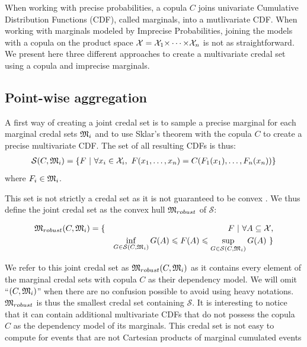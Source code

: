 When working with precise probabilities, a copula $C$ joins univariate Cumulative Distribution Functions (CDF), called marginals, into a mutlivariate CDF. When working with marginals modeled by Imprecise Probabilities, joining the models with a copula on the product space ${\mathcal{X}}={\mathcal{X}}_1{\times\dots\times}{\mathcal{X}}_n$ is not as straightforward. We present here three different approaches to create a multivariate credal set using a copula and imprecise marginals. 

\subsection{Point-wise aggregation}
A first way of creating a joint credal set is to sample a precise marginal for each marginal credal sets ${\mathfrak{M}}_i$ and to use Sklar's theorem with the copula $C$ to create a precise multivariate CDF. The set of all resulting CDFs is thus:
\begin{eqnarray}\label{eq:robust_ancestor}
    \mathcal{S}(C,{\mathfrak{M}}_i) = \{F~|~\forall x_i \in {\mathcal{X}}_i,~ F(x_1,\dots,x_n) = C(F_1(x_1), \dots, F_n(x_n))\}
\end{eqnarray} where $F_i\in{\mathfrak{M}}_i$.

This set is not strictly a credal set as it is not guaranteed to be convex \cite{schmelzer_random_2023}. We thus define the joint credal set as the convex hull ${\mathfrak{M}}_{robust}$ of $\mathcal{S}$:

\begin{eqnarray}\label{eq:robust_set}
    {\mathfrak{M}}_{robust}(C,{\mathfrak{M}}_i) = \{&&F~|~\forall A \subseteq {\mathcal{X}},\nonumber\\
    &&\inf_{G\in\mathcal{S}(C,{\mathfrak{M}}_i)}G(A)\leqslant F(A)\leqslant\sup_{G\in\mathcal{S}(C,{\mathfrak{M}}_i)}G(A)~\}
\end{eqnarray}

We refer to this joint credal set as ${\mathfrak{M}}_{robust}(C,{\mathfrak{M}}_i)$ as it contains every element of the marginal credal sets with copula $C$ as their dependency model. We will omit ``$(C,{\mathfrak{M}}_i)$'' when there are no confusion possible to avoid using heavy notations. ${\mathfrak{M}}_{robust}$ is thus the smallest credal set containing $\mathcal{S}$. It is interesting to notice that it can contain additional multivariate CDFs that do not possess the copula $C$ as the dependency model of its marginals. This credal set is not easy to compute for events that are not Cartesian products of marginal cumulated events


